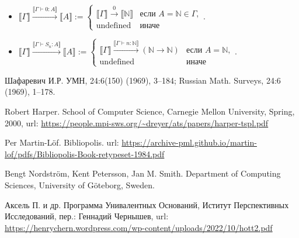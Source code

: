 \documentclass[openany]{book}
\theoremstyle{plain}
\theoremstyle{definition}
\newcommand{\N}{\mathbb{N}}
\begin{document}
\begin{itemize}
    \item \(\llbracket \Gamma \rrbracket \overset{\llbracket \Gamma \vdash 0 : A \rrbracket}{\longrightarrow} \llbracket A \rrbracket := \begin{cases}\llbracket \Gamma \rrbracket \overset{0}{\longrightarrow} \llbracket \N \rrbracket & \text{если }A=\N \in \Gamma,\\ \text{undefined} & \text{иначе}\end{cases}.\)

    \item \(\llbracket \Gamma \rrbracket \overset{\llbracket \Gamma \vdash S_n : A \rrbracket}{\longrightarrow} \llbracket A \rrbracket := \begin{cases}\llbracket \Gamma \rrbracket \overset{\llbracket \Gamma \vdash n : \N \rrbracket}{\longrightarrow} (\N \to \N) & \text{если }A = \N,\\ \text{undefined} & \text{иначе}\end{cases}.\)
\end{itemize}

\begin{thebibliography}{2}

    Шафаревич И.Р.
    \newblock УМН, 24:6(150) (1969), 3–184; Russian Math. Surveys, 24:6 (1969), 1–178.

    Robert Harper.
    \newblock School of Computer Science, Carnegie Mellon University, Spring, 2000,
    \newblock url: \url{https://people.mpi-sws.org/~dreyer/ats/papers/harper-tspl.pdf}

    Per Martin-L\"{o}f.
    \newblock Bibliopolis.
    \newblock url: \url{https://archive-pml.github.io/martin-lof/pdfs/Bibliopolis-Book-retypeset-1984.pdf}

    Bengt Nordstr\"{o}m, Kent Petersson, Jan M. Smith.
    \newblock Department of Computing Sciences, University of G\"{o}teborg, Sweden.

    \bibitem{}
    Аксель П. и др.
    \newblock Программа Унивалентных Оснований, Иститут Перспективных Исследований, пер.: Геннадий Чернышев,
    \newblock url: \url{https://henrychern.wordpress.com/wp-content/uploads/2022/10/hott2.pdf}

\end{thebibliography}
\end{document}
